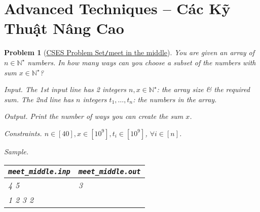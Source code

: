 \documentclass{article}
\newtheorem{problem}{Problem}
\begin{document}

\section{Advanced Techniques -- Các Kỹ Thuật Nâng Cao}

\begin{problem}[\href{https://cses.fi/problemset/task/1628}{CSES Problem Set{\tt/}meet in the middle}]
    You are given an array of $n\in\mathbb{N}^\star$ numbers. In how many ways can you choose a subset of the numbers with sum $x\in\mathbb{N}^\star$?
    \item {\sf Input.} The 1st input line has 2 integers $n,x\in\mathbb{N}^\star$: the array size \& the required sum. The 2nd line has $n$ integers $t_1,\ldots,t_n$: the numbers in the array.
    \item {\sf Output.} Print the number of ways you can create the sum $x$.
    \item {\sf Constraints.} $n\in[40],x\in[10^9],t_i\in[10^9]$, $\forall i\in[n]$.
    \item {\sf Sample.}
    \begin{table}[H]
        \centering
        \begin{tabular}{|l|l|}
            \hline
            \verb|meet_middle.inp| & \verb|meet_middle.out| \\
            \hline
            4 5 & 3 \\
            1 2 3 2 & \\
            \hline
        \end{tabular}
    \end{table}
\end{problem}
\end{document}
